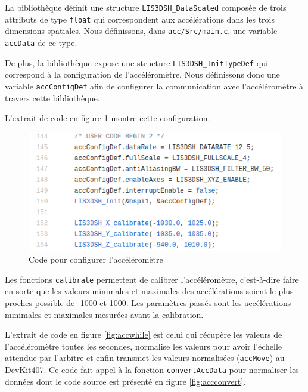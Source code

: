 \documentclass[12pt,french]{article}
\begin{document}
La bibliothèque définit une structure \texttt{LIS3DSH\_DataScaled} composée de trois attributs de type \texttt{float} qui correspondent aux accélérations dans les trois dimensions spatiales. Nous définissons, dans \texttt{acc/Src/main.c}, une variable \texttt{accData} de ce type.

De plus, la bibliothèque expose une structure \texttt{LIS3DSH\_InitTypeDef} qui correspond à la configuration de l'accéléromètre. Nous définissons donc une variable \texttt{accConfigDef} afin de configurer la communication avec l'accéléromètre à travers cette bibliothèque.

L'extrait de code en figure \ref{fig:accconfig} montre cette configuration.

\begin{figure}[h]
\centering
\includegraphics[width=\textwidth]{code_acc_config.png}
\caption{Code pour configurer l'accéléromètre}
\label{fig:accconfig}
\end{figure}

Les fonctions \texttt{calibrate} permettent de calibrer l'accéléromètre, c'est-à-dire faire en sorte que les valeurs minimales et maximales des accélérations soient le plus proches possible de -1000 et 1000. Les paramètres passés sont les accélérations minimales et maximales mesurées avant la calibration.

L'extrait de code en figure \ref{fig:accwhile} est celui qui récupère les valeurs de l'accéléromètre toutes les secondes, normalise les valeurs pour avoir l'échelle attendue par l'arbitre et enfin transmet les valeurs normalisées (\texttt{accMove}) au DevKit407. Ce code fait appel à la fonction \texttt{convertAccData} pour normaliser les données dont le code source est présenté en figure \ref{fig:accconvert}.
\end{document}
